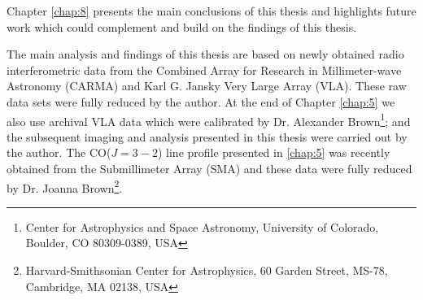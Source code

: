 Chapter \ref{chap:8} presents the main conclusions of this thesis and highlights future work which could complement and build on the findings of this thesis.

The main analysis and findings of this thesis are based on newly obtained radio interferometric data from the Combined Array for Research in Millimeter-wave Astronomy (CARMA) and Karl G. Jansky Very Large Array (VLA). These raw data sets were fully reduced by the author. At the end of Chapter \ref{chap:5} we also use archival VLA data which were calibrated by Dr. Alexander Brown\footnote{Center for Astrophysics and Space Astronomy, University of Colorado, Boulder, CO 80309-0389, USA}; and the subsequent imaging and analysis presented in this thesis were carried out by the author. The CO($J=3-2$) line profile presented in \ref{chap:5} was recently obtained from the Submillimeter Array (SMA) and these data were fully reduced by Dr. Joanna Brown\footnote{Harvard-Smithsonian Center for Astrophysics, 60 Garden Street, MS-78, Cambridge, MA 02138, USA}.